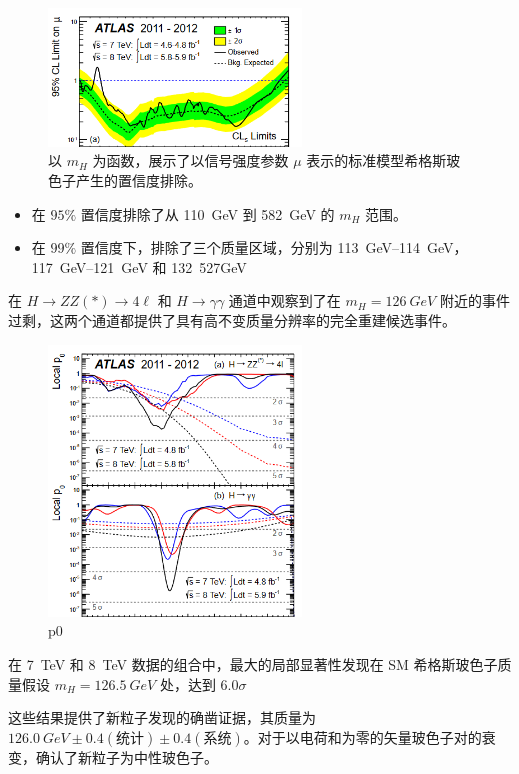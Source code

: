 \begin{figure}[htbp]
    \centering
    \includegraphics[width=0.6\textwidth]{pic/95CL.png}
    \caption{以 $m_H$ 为函数，展示了以信号强度参数 $\mu$ 表示的标准模型希格斯玻色子产生的置信度排除。}
    \label{fig:mH}
\end{figure}

\begin{itemize}
    \item 在 $95\%$ 置信度排除了从 \qty{110}{GeV} 到 \qty{582}{GeV} 的 $m_H$ 范围。
    \item 在 $99\%$ 置信度下，排除了三个质量区域，分别为 \qtyrange{113}{114}{GeV}，\qtyrange{117}{121}{GeV} 和 \qty{132}{527}{GeV} 
\end{itemize}

在 $H\to ZZ(*)\to 4\ell$ 和 $H\to\gamma\gamma$ 通道中观察到了在 $m_H=\qty{126}{GeV}$ 附近的事件过剩，这两个通道都提供了具有高不变质量分辨率的完全重建候选事件。

\begin{figure}[htbp]
    \centering
    \includegraphics[width=0.6\textwidth]{pic/p0.png}
    \caption{p0}
    \label{fig:p0}
\end{figure}

在 \qty{7}{TeV} 和 \qty{8}{TeV} 数据的组合中，最大的局部显著性发现在 SM 希格斯玻色子质量假设 $m_H=\qty{126.5}{GeV}$ 处，达到 $6.0\sigma$

这些结果提供了新粒子发现的确凿证据，其质量为 $\qty{126.0}{GeV} \pm 0.4(\text{统计}) \pm 0.4(\text{系统})$。对于以电荷和为零的矢量玻色子对的衰变，确认了新粒子为中性玻色子。
